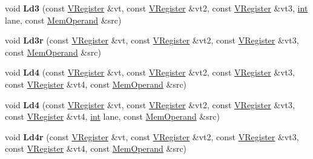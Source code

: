 \begin{DoxyCompactItemize}
void {\bfseries Ld3} (const \mbox{\hyperlink{classv8_1_1internal_1_1VRegister}{V\+Register}} \&vt, const \mbox{\hyperlink{classv8_1_1internal_1_1VRegister}{V\+Register}} \&vt2, const \mbox{\hyperlink{classv8_1_1internal_1_1VRegister}{V\+Register}} \&vt3, \mbox{\hyperlink{classint}{int}} lane, const \mbox{\hyperlink{classv8_1_1internal_1_1MemOperand}{Mem\+Operand}} \&src)
\item 
\mbox{\label{classv8_1_1internal_1_1MacroAssembler_a4ee28b466fa32d7d8cce198615bf2728}} 
void {\bfseries Ld3r} (const \mbox{\hyperlink{classv8_1_1internal_1_1VRegister}{V\+Register}} \&vt, const \mbox{\hyperlink{classv8_1_1internal_1_1VRegister}{V\+Register}} \&vt2, const \mbox{\hyperlink{classv8_1_1internal_1_1VRegister}{V\+Register}} \&vt3, const \mbox{\hyperlink{classv8_1_1internal_1_1MemOperand}{Mem\+Operand}} \&src)
\item 
\mbox{\label{classv8_1_1internal_1_1MacroAssembler_a7bf4398f0ff54f5dc66eb15208ca9471}} 
void {\bfseries Ld4} (const \mbox{\hyperlink{classv8_1_1internal_1_1VRegister}{V\+Register}} \&vt, const \mbox{\hyperlink{classv8_1_1internal_1_1VRegister}{V\+Register}} \&vt2, const \mbox{\hyperlink{classv8_1_1internal_1_1VRegister}{V\+Register}} \&vt3, const \mbox{\hyperlink{classv8_1_1internal_1_1VRegister}{V\+Register}} \&vt4, const \mbox{\hyperlink{classv8_1_1internal_1_1MemOperand}{Mem\+Operand}} \&src)
\item 
\mbox{\label{classv8_1_1internal_1_1MacroAssembler_a599681a902f54a6366f82e37c4439582}} 
void {\bfseries Ld4} (const \mbox{\hyperlink{classv8_1_1internal_1_1VRegister}{V\+Register}} \&vt, const \mbox{\hyperlink{classv8_1_1internal_1_1VRegister}{V\+Register}} \&vt2, const \mbox{\hyperlink{classv8_1_1internal_1_1VRegister}{V\+Register}} \&vt3, const \mbox{\hyperlink{classv8_1_1internal_1_1VRegister}{V\+Register}} \&vt4, \mbox{\hyperlink{classint}{int}} lane, const \mbox{\hyperlink{classv8_1_1internal_1_1MemOperand}{Mem\+Operand}} \&src)
\item 
\mbox{\label{classv8_1_1internal_1_1MacroAssembler_a66a73e27acd51808cf196bb047ed9999}} 
void {\bfseries Ld4r} (const \mbox{\hyperlink{classv8_1_1internal_1_1VRegister}{V\+Register}} \&vt, const \mbox{\hyperlink{classv8_1_1internal_1_1VRegister}{V\+Register}} \&vt2, const \mbox{\hyperlink{classv8_1_1internal_1_1VRegister}{V\+Register}} \&vt3, const \mbox{\hyperlink{classv8_1_1internal_1_1VRegister}{V\+Register}} \&vt4, const \mbox{\hyperlink{classv8_1_1internal_1_1MemOperand}{Mem\+Operand}} \&src)

\end{DoxyCompactItemize}
